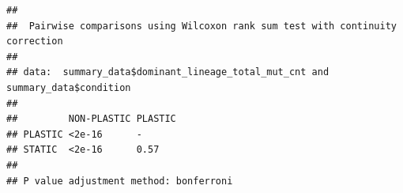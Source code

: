 \documentclass[]{book}
\begin{document}
\begin{verbatim}
## 
##  Pairwise comparisons using Wilcoxon rank sum test with continuity correction 
## 
## data:  summary_data$dominant_lineage_total_mut_cnt and summary_data$condition 
## 
##         NON-PLASTIC PLASTIC
## PLASTIC <2e-16      -      
## STATIC  <2e-16      0.57   
## 
## P value adjustment method: bonferroni
\end{verbatim}


\end{document}
